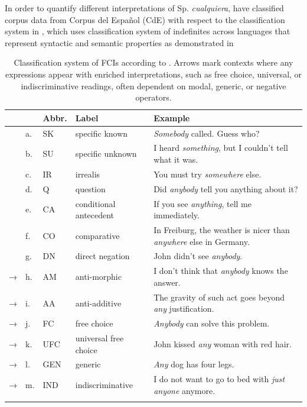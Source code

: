 In order to quantify different interpretations of Sp. \textit{cualquiera}, \citet{AloniEtAl2010} have classified corpus data from Corpus del Español (CdE) with respect to the classification system in , which uses  classification system of indefinites across languages that represent syntactic and semantic properties as demonstrated in  %


\begin{table}[t]
\begin{tabularx}{\textwidth}{llllQ}
\lsptoprule
&  &  {Abbr.} &  {Label} &  {Example}\\
\midrule
& a. & SK & specific known & \textit{Somebody} called. Guess who?\\
& b. & SU & specific unknown & I heard \textit{something}, but I couldn’t tell what it was.\\
& c. & IR & irrealis & You must try \textit{somewhere} else.\\
& d. & Q & question & Did \textit{anybody} tell you anything about it?\\
& e. & CA & conditional antecedent & If you see \textit{anything}, tell me immediately.\\
& f. & CO & comparative & In Freiburg, the weather is nicer than \textit{anywhere} else in Germany.\\
& g. & DN & direct negation & John didn’t see \textit{anybody}.\\
→ & h. & AM & anti-morphic & I don’t think that \textit{anybody} knows the answer.\\
→ & i. & AA & anti-additive & The gravity of such act goes beyond \textit{any} justification.\\
→ & j. & FC & free choice & \textit{Anybody} can solve this problem.\\
→ & k. & UFC & universal free choice & John kissed \textit{any} woman with red hair.\\
→ & l. & GEN & generic & \textit{Any} dog has four legs.\\
→ & m. & IND & indiscriminative & I do not want to go to bed with \textit{just anyone} anymore.\\
\lspbottomrule
\end{tabularx}
\caption{\label{tab:key:fig} Classification system of FCIs according to \citet{AloniEtAl2010}. Arrows mark contexts where any expressions appear with enriched interpretations, such as free choice, universal, or indiscriminative readings, often dependent on modal, generic, or negative operators.} %
\end{table}

